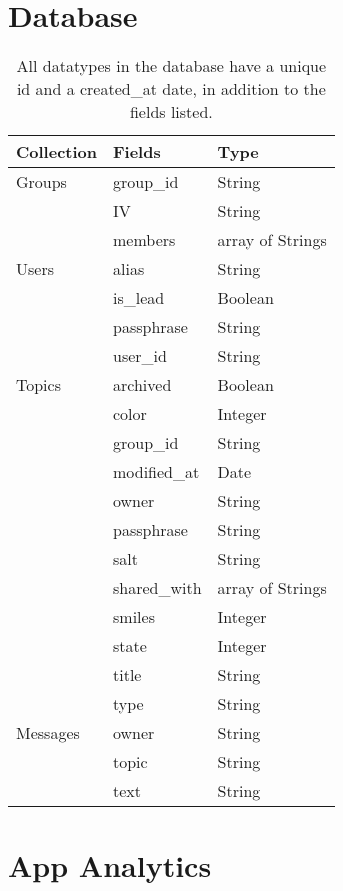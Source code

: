 \section{Database}
\label{sec:appb_data}
\vspace*{-3in}
    \renewcommand{\arraystretch}{1.2}
    \begin{table}
    \centering
    \begin{tabular}{  l  l  l }
    \hline
    Collection & Fields & Type \\
    \hline
    Groups
    & group\_id & String \\
    & IV & String \\
    & members & array of Strings \\
    \hline
    Users
    & alias & String \\
    & is\_lead & Boolean \\
    & passphrase & String \\
    & user\_id & String \\
    \hline
    Topics
    & archived & Boolean \\
    & color & Integer \\
    & group\_id & String \\
    & modified\_at & Date \\
    & owner & String \\
    & passphrase & String \\
    & salt & String \\
    & shared\_with & array of Strings \\
    & smiles & Integer \\
    & state & Integer \\
    & title & String \\
    & type & String \\
    \hline
    Messages
    & owner & String \\
    & topic & String \\
    & text & String \\
    \end{tabular}
    \caption[Datatypes in DB]{
    All datatypes in the database have a unique id and a created\_at date,
    in addition to the fields listed.}
    \label{fig:api_table}
    \end{table}

\section{App Analytics}


\clearpage
\newpage
